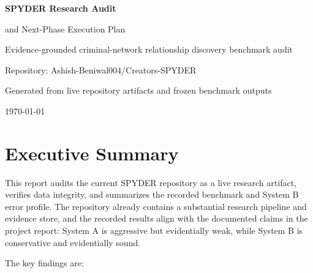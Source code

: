 \documentclass[11pt,a4paper]{article}
\begin{document}
\begin{titlepage}
  \centering
  \vspace*{2cm}
  {\Huge\bfseries\color{navy} SPYDER Research Audit\par}
  \vspace{0.5cm}
  {\Large and Next-Phase Execution Plan\par}
  \vspace{1.5cm}
  {\large Evidence-grounded criminal-network relationship discovery benchmark audit\par}
  \vspace{1cm}
  {\large Repository: Ashish-Beniwal004/Creators-SPYDER\par}
  \vspace{0.8cm}
  {\large Generated from live repository artifacts and frozen benchmark outputs\par}
  \vspace{2.5cm}
  {\large \today\par}
\end{titlepage}

\tableofcontents
\newpage

\section{Executive Summary}

This report audits the current SPYDER repository as a live research artifact, verifies data integrity, and summarizes the recorded benchmark and System B error profile. The repository already contains a substantial research pipeline and evidence store, and the recorded results align with the documented claims in the project report: System A is aggressive but evidentially weak, while System B is conservative and evidentially sound.

The key findings are:
\end{document}
